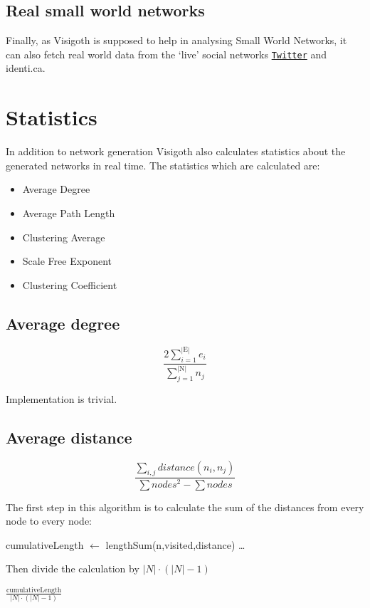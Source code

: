\documentclass[a4paper,11pt,titlepage]{article}
\let\stdhref\href
\renewcommand{\href}[2]{\stdhref{#1}{\texttt{#2}}}
\let\stdsection\section         %
\renewcommand{\section}{\newpage\stdsection}
\newcommand{\Twitter}{\href{http://twitter.com}{Twitter} }
\begin{document}
\subsection{Real small world networks}
Finally, as Visigoth is supposed to help in analysing Small World
Networks, it can also fetch real world data from the `live' social
networks \Twitter and identi.ca.



\section{Statistics}
In addition to network generation Visigoth also calculates statistics about the
generated networks in real time. The statistics which are calculated are:

\begin{itemize}
  \item Average Degree
  \item Average Path Length
  \item Clustering Average
  \item Scale Free Exponent
  \item Clustering Coefficient
\end{itemize}


\subsection{Average degree}
\[ \frac{2\sum_{i=1}^{\mathrm{|E|}} e_i}
        {\sum_{j=1}^{\mathrm{|N|}} n_j}
\]

Implementation is trivial.


\subsection{Average distance}
\[ \frac{\sum_{i,j}distance(n_i,n_j)}
        {\sum nodes^2 - \sum nodes}
\]

The first step in this algorithm is to calculate the sum of the
distances from every node to every node:

\begin{algorithmic}
    \STATE cumulativeLength $\gets$ lengthSum(n,visited,distance)
    \STATE \dots
  \ENDFOR
\end{algorithmic}
Then divide the calculation by $|N| \cdot (|N| - 1)$
\begin{algorithmic}
  \RETURN $\frac{\mathrm{cumulativeLength}}{|N| \cdot (|N| - 1)}$
\end{algorithmic}
\end{document}
